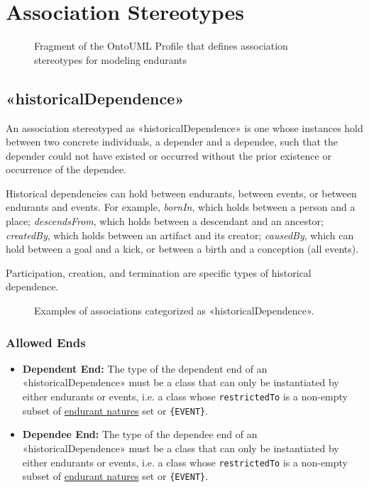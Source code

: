 \section{Association Stereotypes}

\begin{figure}[h]
    \centering
    
    \caption{Fragment of the OntoUML Profile that defines association stereotypes for modeling endurants}
    \label{fig:event-associations-profile}
\end{figure}

\subsection{«historicalDependence»}
\label{stereotype:historicalDependence}

An association stereotyped as «historicalDependence» is one whose instances hold between two concrete individuals, a depender and a dependee, such that the depender could not have existed or occurred without the prior existence or occurrence of the dependee.

Historical dependencies can hold between endurants, between events, or between endurants and events. For example, \textit{bornIn}, which holds between a person and a place; \textit{descendsFrom}, which holds between a descendant and an ancestor; \textit{createdBy}, which holds between an artifact and its creator; \textit{causedBy}, which can hold between a goal and a kick, or between a birth and a conception (all events).

Participation, creation, and termination are specific types of historical dependence. 

\begin{figure}[h]
    \centering
    
    \caption{Examples of associations categorized as «historicalDependence».}
    \label{fig:historicalDependence-example}
\end{figure}

\subsubsection{Allowed Ends}

\begin{itemize}
    \item \textbf{Dependent End:} The type of the dependent end of an «historicalDependence» must be a class that can only be instantiated by either endurants or events, i.e. a class whose \texttt{restrictedTo} is a non-empty subset of \hyperref[par:endurant-nature]{endurant natures} set or \texttt{\{EVENT\}}.
    \item \textbf{Dependee End:} The type of the dependee end of an «historicalDependence» must be a class that can only be instantiated by either endurants or events, i.e. a class whose \texttt{restrictedTo} is a non-empty subset of \hyperref[par:endurant-nature]{endurant natures} set or \texttt{\{EVENT\}}.
\end{itemize}

